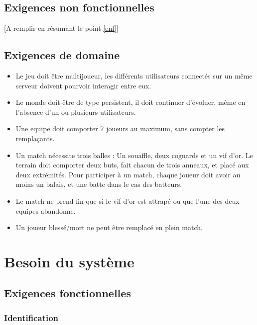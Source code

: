 \documentclass[a4paper]{article}
\begin{document}

\subsection{Exigences non fonctionnelles}
[A remplir en résumant le point \ref{enf}]


\subsection{Exigences de domaine}
\begin{itemize}
    \item Le jeu doit être multijoueur, les différents \glspl{utilisateur} connectés sur un même \gls{serveur} doivent pourvoir interagir entre eux.
    \item Le monde doit être de type persistent, il doit continuer d'évoluer, même en l'absence d'un ou plusieurs \glspl{utilisateur}.
    \item Une \gls{equipe} doit comporter 7 \glspl{joueur} au maximum, sans compter les remplaçants.
    \item Un match nécessite trois balles : Un souaffle, deux cognards et un vif d'or. Le terrain doit comporter deux buts, fait chacun de trois anneaux, et placé aux deux extrémités. Pour participer à un match, chaque \gls{joueur} doit avoir au moins un balais, et une batte dans le cas des batteurs.
    \item Le match ne prend fin que si le vif d'or est attrapé ou que l'une des deux \glspl{equipe} abandonne.
    \item Un \gls{joueur} blessé/mort ne peut être remplacé en plein match.
\end{itemize}


\section{Besoin du système}
\subsection{Exigences fonctionnelles}

\subsubsection{Identification}
\end{document}
